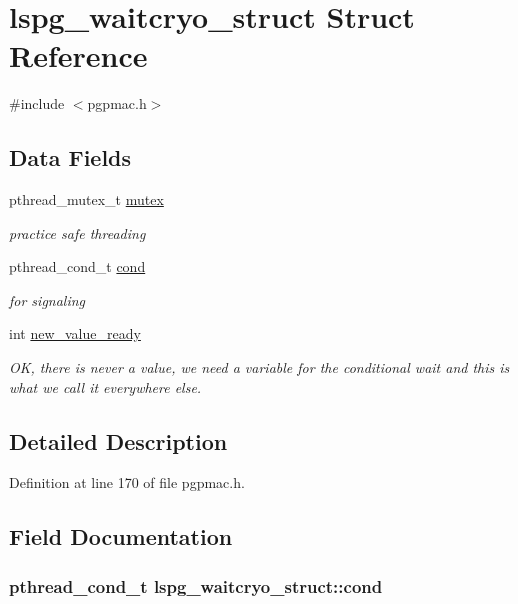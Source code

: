 \hypertarget{structlspg__waitcryo__struct}{\section{lspg\-\_\-waitcryo\-\_\-struct Struct Reference}
\label{structlspg__waitcryo__struct}
}


{\ttfamily \#include $<$pgpmac.\-h$>$}

\subsection*{Data Fields}
\begin{DoxyCompactItemize}
\item 
pthread\-\_\-mutex\-\_\-t \hyperlink{structlspg__waitcryo__struct_a62b50ead380fc8a6be35956eba384ba6}{mutex}
\begin{DoxyCompactList}\small\item\em practice safe threading \end{DoxyCompactList}\item 
pthread\-\_\-cond\-\_\-t \hyperlink{structlspg__waitcryo__struct_a54c275159d9f096e0d1884e64d099298}{cond}
\begin{DoxyCompactList}\small\item\em for signaling \end{DoxyCompactList}\item 
int \hyperlink{structlspg__waitcryo__struct_a97298b773fd8c1f2ef20159093a08246}{new\-\_\-value\-\_\-ready}
\begin{DoxyCompactList}\small\item\em O\-K, there is never a value, we need a variable for the conditional wait and this is what we call it everywhere else. \end{DoxyCompactList}\end{DoxyCompactItemize}


\subsection{Detailed Description}


Definition at line 170 of file pgpmac.\-h.



\subsection{Field Documentation}
\hypertarget{structlspg__waitcryo__struct_a54c275159d9f096e0d1884e64d099298}{
\subsubsection[{cond}]{\setlength{\rightskip}{0pt plus 5cm}pthread\-\_\-cond\-\_\-t lspg\-\_\-waitcryo\-\_\-struct\-::cond}}\label{structlspg__waitcryo__struct_a54c275159d9f096e0d1884e64d099298}


